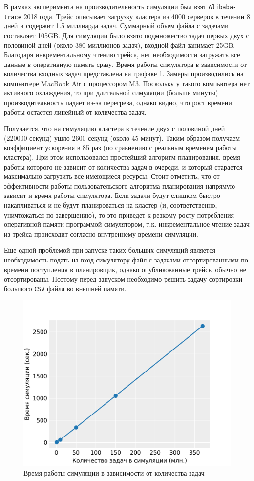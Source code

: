 В рамках эксперимента на производительность симуляции был взят \texttt{Alibaba-trace} 2018 года\cite{alibaba-clusterdata}. Трейс описывает загрузку кластера из 4000 серверов в течении 8 дней и содержит 1.5 миллиарда задач. Суммарный объем файла с задачами составляет 105GB. Для симуляции было взято подмножество задач первых двух с половиной дней (около 380 миллионов задач), входной файл занимает 25GB. Благодаря инкрементальному чтению трейса, нет необходимости загружать все данные в оперативную память сразу. Время работы симулятора в зависимости от количества входных задач представлена на графике \ref{fig:speed-test}. Замеры производились на компьютере MacBook Air с процессором M3. Поскольку у такого компьютера нет активного охлаждения, то при длительной симуляции (больше минуты) производительность падает из-за перегрева, однако видно, что рост времени работы остается линейный от количества задач.

Получается, что на симуляцию кластера в течение двух с половиной дней (220000 секунд) ушло 2600 секунд (около 45 минут). Таким образом получаем коэффициент ускорения в 85 раз (по сравнению с реальным временем работы кластера). При этом использовался простейший алгоритм планирования, время работы которого не зависит от количества задач в очереди, и который старается максимально загрузить все имеющиеся ресурсы. Стоит отметить, что от эффективности работы пользовательского алгоритма планирования напрямую зависит и время работы симулятора. Если задачи будут слишком быстро накапливаться и не будут планироваться на кластер (и, соответственно, уничтожаться по завершению), то это приведет к резкому росту потребления оперативной памяти программой-симулятором, т.к. инкрементальное чтение задач из трейса происходит согласно внутреннему времени симуляции.

Еще одной проблемой при запуске таких больших симуляций является необходимость подать на вход симулятору файл с задачами отсортированными по времени поступления в планировщик, однако опубликованные трейсы обычно не отсортированы. Поэтому перед запуском необходимо решить задачу сортировки большого \texttt{CSV} файла во внешней памяти. 

\begin{figure}[h!]
  \centering 
  \includegraphics[width=0.8\linewidth]{images/simulation_time}
  \caption{Время работы симуляции в зависимости от количества задач}
  \label{fig:speed-test}
\end{figure}

